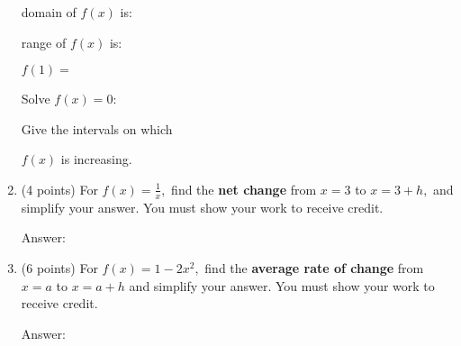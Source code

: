 \documentclass[11pt]{article}
\begin{document}
\begin{enumerate}
\vspace{-2.5in}
\begin{flushright}{domain of $f(x)$ is: \underline{\hspace{2in}}}\end{flushright}
\begin{flushright}{range of $f(x)$ is: \underline{\hspace{2in}}}\end{flushright}
\begin{flushright}{$f(1)= $\underline{\hspace{2in}}}\end{flushright}
\begin{flushright}{Solve $f(x)=0:$\underline{\hspace{2in}}}\end{flushright}

\hspace{3.25in} Give the intervals on which
\begin{flushright}{ $f(x)$ is increasing.\underline{\hspace{2in}}}\end{flushright}

\newpage
\item (4 points) For $f(x)=\frac{1}{x},$  find the {\bf{net change}} from $x=3$ to $x=3+h,$ and simplify your answer. You must show your work to receive credit.

\begin{flushright}{ Answer:\underline{\hspace{2in}}}\end{flushright}
\vfill

\item (6 points) For $f(x)=1-2x^2,$ find the {\bf{average rate of change}} from $x=a$ to $x=a+h$ and simplify your answer. You must show your work to receive credit.

\begin{flushright}{ Answer:\underline{\hspace{2in}}}\end{flushright}
\vfill



\end{enumerate}
\end{document}
